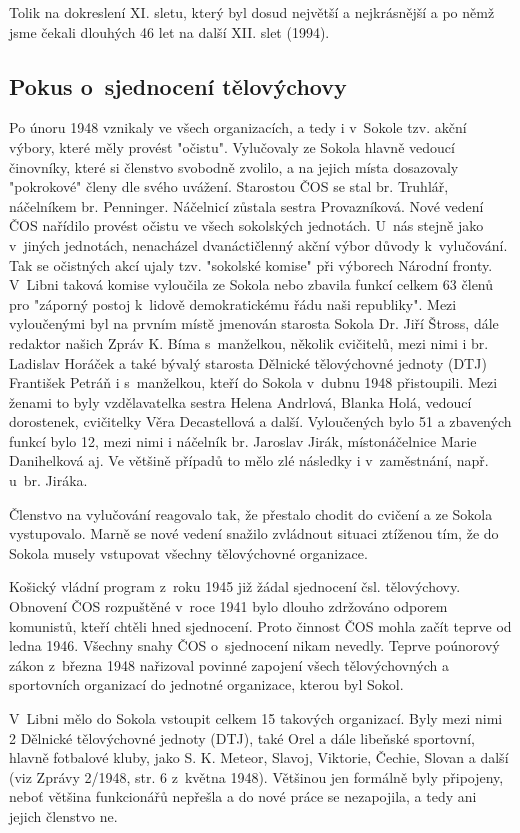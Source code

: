 \documentclass[a5paper, 11pt, twoside]{article}
\begin{document}
Tolik na dokreslení XI. sletu, který byl dosud největší a nejkrásnější a
po němž jsme čekali dlouhých 46 let na další XII. slet (1994).

\subsection{Pokus o~sjednocení tělovýchovy}

Po únoru 1948 vznikaly ve všech organizacích, a tedy i v~Sokole tzv.
akční výbory, které měly provést "očistu". Vylučovaly ze Sokola hlavně
vedoucí činovníky, které si členstvo svobodně zvolilo, a na jejich místa
dosazovaly "pokrokové" členy dle svého uvážení. Starostou ČOS se stal
br. Truhlář, náčelníkem br. Penninger. Náčelnicí zůstala sestra
Provazníková. Nové vedení ČOS nařídilo provést očistu ve všech
sokolských jednotách. U~nás stejně jako v~jiných jednotách, nenacházel
dvanáctičlenný akční výbor důvody k~vylučování. Tak se očistných akcí
ujaly tzv. "sokolské komise" při výborech Národní fronty. V~Libni
taková komise vyloučila ze Sokola nebo zbavila funkcí celkem 63 členů
pro "záporný postoj k~lidově demokratickému řádu naši republiky". Mezi
vyloučenými byl na prvním místě jmenován starosta Sokola Dr. Jiří
Štross, dále redaktor našich Zpráv K. Bíma s~manželkou, několik
cvičitelů, mezi nimi i br. Ladislav Horáček a také bývalý starosta
Dělnické tělovýchovné jednoty (DTJ) František Petráň i s~manželkou,
kteří do Sokola v~dubnu 1948 přistoupili. Mezi ženami to byly
vzdělavatelka sestra Helena Andrlová, Blanka Holá, vedoucí dorostenek,
cvičitelky Věra Decastellová a další. Vyloučených bylo 51 a zbavených
funkcí bylo 12, mezi nimi i náčelník br. Jaroslav Jirák, místonáčelnice
Marie Danihelková aj. Ve většině případů to mělo zlé následky i
v~zaměstnání, např. u~br. Jiráka.

Členstvo na vylučování reagovalo tak, že přestalo chodit do cvičení a ze
Sokola vystupovalo. Marně se nové vedení snažilo zvládnout situaci
ztíženou tím, že do Sokola musely vstupovat všechny tělovýchovné
organizace.

Košický vládní program z~roku 1945 již žádal sjednocení čsl.
tělovýchovy. Obnovení ČOS rozpuštěné v~roce 1941 bylo dlouho zdržováno
odporem komunistů, kteří chtěli hned sjednocení. Proto činnost ČOS mohla
začít teprve od ledna 1946. Všechny snahy ČOS o~sjednocení nikam
nevedly. Teprve poúnorový zákon z~března 1948 nařizoval povinné zapojení
všech tělovýchovných a sportovních organizací do jednotné organizace,
kterou byl Sokol.

V~Libni mělo do Sokola vstoupit celkem 15 takových organizací. Byly mezi
nimi 2 Dělnické tělovýchovné jednoty (DTJ), také Orel a dále libeňské
sportovní, hlavně fotbalové kluby, jako S. K. Meteor, Slavoj, Viktorie,
Čechie, Slovan a další (viz Zprávy 2/1948, str. 6 z~května 1948).
Většinou jen formálně byly připojeny, neboť většina funkcionářů nepřešla
a do nové práce se nezapojila, a tedy ani jejich členstvo ne.
\end{document}
